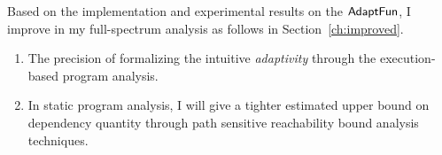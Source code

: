 Based on the implementation and experimental results on the $\textsf{AdaptFun}$,
I 
improve in my full-spectrum analysis as follows in Section~\ref{ch:improved}.
\begin{enumerate}
 \item The precision of formalizing the intuitive \emph{adaptivity} 
through the execution-based program analysis.

\item In static program analysis, I will give a tighter estimated upper bound on dependency quantity through 
path sensitive reachability bound analysis techniques. 

\end{enumerate}

